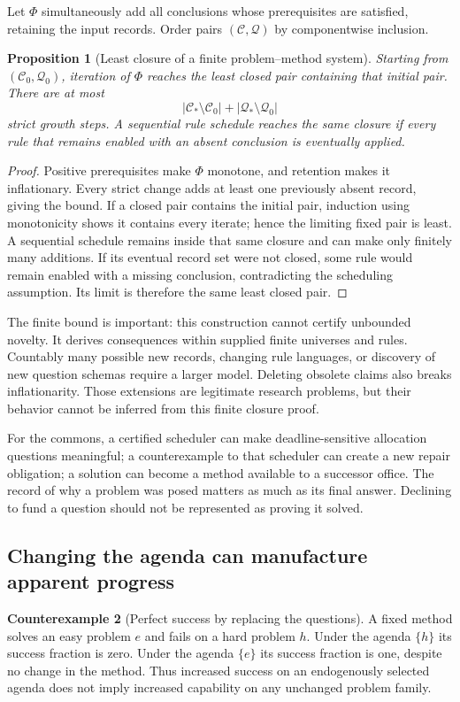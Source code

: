 \documentclass[11pt,letterpaper]{article}
\theoremstyle{plain}
\newtheorem{proposition}{Proposition}[section]
\theoremstyle{definition}
\newtheorem{counterexample}[proposition]{Counterexample}
\theoremstyle{remark}
\begin{document}
Let $\Phi$ simultaneously add all conclusions whose prerequisites are satisfied, retaining the input records. Order pairs $(\mathcal C,\mathcal Q)$ by componentwise inclusion.
\begin{proposition}[Least closure of a finite problem--method system]\label{prop:agendaclosure}
Starting from $(\mathcal C_0,\mathcal Q_0)$, iteration of $\Phi$ reaches the least closed pair containing that initial pair. There are at most
\[
|\mathcal C_*\setminus\mathcal C_0|+|\mathcal Q_*\setminus\mathcal Q_0|
\]
strict growth steps. A sequential rule schedule reaches the same closure if every rule that remains enabled with an absent conclusion is eventually applied.
\end{proposition}
\begin{proof}
Positive prerequisites make $\Phi$ monotone, and retention makes it inflationary. Every strict change adds at least one previously absent record, giving the bound. If a closed pair contains the initial pair, induction using monotonicity shows it contains every iterate; hence the limiting fixed pair is least. A sequential schedule remains inside that same closure and can make only finitely many additions. If its eventual record set were not closed, some rule would remain enabled with a missing conclusion, contradicting the scheduling assumption. Its limit is therefore the same least closed pair.
\end{proof}

The finite bound is important: this construction cannot certify unbounded novelty. It derives consequences within supplied finite universes and rules. Countably many possible new records, changing rule languages, or discovery of new question schemas require a larger model. Deleting obsolete claims also breaks inflationarity. Those extensions are legitimate research problems, but their behavior cannot be inferred from this finite closure proof.

For the commons, a certified scheduler can make deadline-sensitive allocation questions meaningful; a counterexample to that scheduler can create a new repair obligation; a solution can become a method available to a successor office. The record of why a problem was posed matters as much as its final answer. Declining to fund a question should not be represented as proving it solved.

\subsection{Changing the agenda can manufacture apparent progress}
\begin{counterexample}[Perfect success by replacing the questions]\label{ex:agendadrift}
A fixed method solves an easy problem $e$ and fails on a hard problem $h$. Under the agenda $\{h\}$ its success fraction is zero. Under the agenda $\{e\}$ its success fraction is one, despite no change in the method. Thus increased success on an endogenously selected agenda does not imply increased capability on any unchanged problem family.
\end{counterexample}
\end{document}
